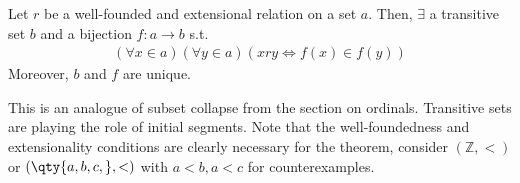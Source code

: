 

\begin{theorem}
    Let $r$ be a well-founded and extensional relation on a set $a$.
    Then, $\exists$ a transitive set $b$ and a bijection $f \colon a \to b$ s.t.
    \begin{align*}
        (\forall x \in a)(\forall y \in a)(x r y \Leftrightarrow f(x) \in f(y))
    \end{align*}
    Moreover, $b$ and $f$ are unique.
\end{theorem}

This is an analogue of subset collapse from the section on ordinals.
Transitive sets are playing the role of initial segments.
Note that the well-foundedness and extensionality conditions are clearly necessary for the theorem, consider $(\mathbb Z, <)$ or $(\qty{a,b,c,},<)$ with $a<b, a<c$ for counterexamples.


